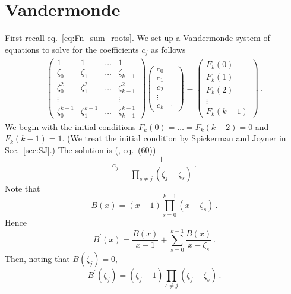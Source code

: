 \documentclass[review]{elsarticle}
\theoremstyle{plain}
\begin{document}
\setcounter{equation}{0}
\section{Vandermonde}\label{sec:vdm}
First recall eq.~\eqref{eq:Fn_sum_roots}.
We set up a Vandermonde system of equations to solve for the coefficients $c_j$ as follows
\begin{equation}
\label{eq:vdm_eqns}
\begin{split}
\begin{pmatrix} 
1 & 1 & \dots & 1 \\
\zeta_0 & \zeta_1 & \dots & \zeta_{k-1} \\
\zeta_0^2 & \zeta_1^2 & \dots & \zeta_{k-1}^2 \\
\vdots &&& \vdots \\
\zeta_0^{k-1} & \zeta_1^{k-1} & \dots & \zeta_{k-1}^{k-1} 
\end{pmatrix}
\begin{pmatrix} 
c_0 \\
c_1 \\
c_2 \\
\vdots \\
c_{k-1} 
\end{pmatrix}
=
\begin{pmatrix} 
F_k(0) \\
F_k(1) \\
F_k(2) \\
\vdots \\
F_k(k-1)
\end{pmatrix} \,.
\end{split}
\end{equation}
We begin with the initial conditions $F_k(0)=\dots=F_k(k-2)=0$ and $F_k(k-1)=1$.
(We treat the initial condition by Spickerman and Joyner \cite{SpickermanJoyner} in Sec.~\ref{sec:SJ}.)
The solution is (\cite{DM3}, eq.~(60))
\begin{equation}
\label{eq:sol_cell}
c_j = \frac{1}{\prod_{s\ne j}(\zeta_j-\zeta_s)} \,.
\end{equation}
Note that
\begin{equation}
B(x) = (x-1)\prod_{s=0}^{k-1}(x-\zeta_s) \,.
\end{equation}
Hence
\begin{equation}  
B^\prime(x) = \frac{B(x)}{x-1} +\sum_{s=0}^{k-1} \frac{B(x)}{x-\zeta_s} \,.
\end{equation}
Then, noting that $B(\zeta_j)=0$,
\begin{equation}  
B^\prime(\zeta_j) = (\zeta_j-1)\prod_{s\ne j}(\zeta_j-\zeta_s) \,.
\end{equation}
\end{document}
